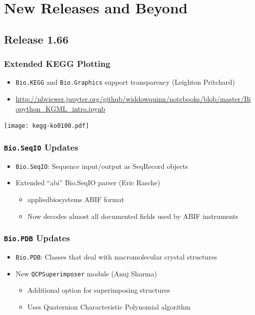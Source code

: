 \documentclass[trans]{beamer}
\begin{document}

\section{New Releases and Beyond}
\subsection*{Release 1.66}
\frame
{
}

\frame
{
  \frametitle{Extended KEGG Plotting}
  
  \begin{itemize}
  \item \texttt{Bio.KEGG} and \texttt{Bio.Graphics} support transparency (Leighton Pritchard)
  \item \url{http://nbviewer.jupyter.org/github/widdowquinn/notebooks/blob/master/Biopython_KGML_intro.ipynb}
  \end{itemize}
  
  \begin{center}
  \texttt{[image: kegg-ko0100.pdf]}
  \end{center}
}

\frame
{
  \frametitle{\texttt{Bio.SeqIO} Updates}
  
  \begin{itemize}
  \item \texttt{Bio.SeqIO}: Sequence input/output as SeqRecord objects  
  \item Extended ``abi'' Bio.SeqIO parser (Eric Rasche)
  \begin{itemize}
  \item appliedbiosystems ABIF format
  \item Now decodes almost all documented fields used by ABIF instruments
  \end{itemize}
  \end{itemize}
}

\frame
{
  \frametitle{\texttt{Bio.PDB} Updates}
  
  \begin{itemize}
  \item \texttt{Bio.PDB}: Classes that deal with macromolecular crystal structures  
  \item New \texttt{QCPSuperimposer} module (Anuj Sharma)
  \begin{itemize}
  \item Additional option for superimposing structures
  \item Uses Quaternion Characteristic Polynomial algorithm
  \end{itemize}
  \end{itemize}
  
  
}
\end{document}
